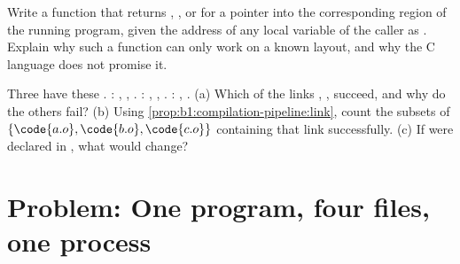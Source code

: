 \begin{exercise}[$\star\star\star$]\label{exo:b1:compilation-pipeline:11}
Write a function  that returns
, ,  or  for a pointer into the corresponding region
of the running program, given the address of any local variable of the caller as . Explain
why such a function can only work on a known layout, and why the C language does not promise it.
\end{exercise}

\begin{exercise}[$\star\star\star$]\label{exo:b1:compilation-pipeline:12}
Three  have these . : , , .
: , , . : , .
(a) Which of the links , ,  succeed, and why do the others fail?
(b) Using \cref{prop:b1:compilation-pipeline:link}, count the subsets of $\{\code{a.o}, \code{b.o},
\code{c.o}\}$ containing  that link successfully.
(c) If  were declared  in , what would change?
\end{exercise}

\section{Problem: One program, four files, one process}\label{sec:b1:compilation-pipeline:problem}

